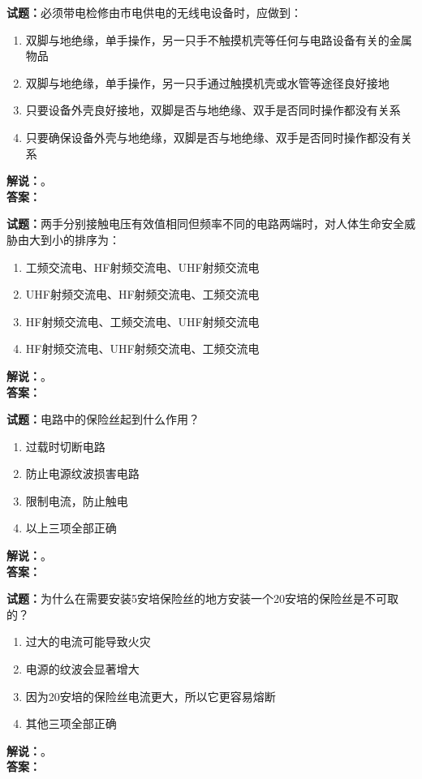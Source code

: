\documentclass{ctexbook}
\begin{document}
\bigskip




\noindent\textbf{试题：}必须带电检修由市电供电的无线电设备时，应做到：
\begin{enumerate}[leftmargin=3em]
\item 双脚与地绝缘，单手操作，另一只手不触摸机壳等任何与电路设备有关的金属物品
\item 双脚与地绝缘，单手操作，另一只手通过触摸机壳或水管等途径良好接地
\item 只要设备外壳良好接地，双脚是否与地绝缘、双手是否同时操作都没有关系
\item 只要确保设备外壳与地绝缘，双脚是否与地绝缘、双手是否同时操作都没有关系
\end{enumerate}
\noindent\textbf{解说：}\textbf{}。\\\noindent\textbf{答案：}

\bigskip




\noindent\textbf{试题：}两手分别接触电压有效值相同但频率不同的电路两端时，对人体生命安全威胁由大到小的排序为：
\begin{enumerate}[leftmargin=3em]
\item 工频交流电、HF射频交流电、UHF射频交流电
\item UHF射频交流电、HF射频交流电、工频交流电
\item HF射频交流电、工频交流电、UHF射频交流电
\item HF射频交流电、UHF射频交流电、工频交流电
\end{enumerate}
\noindent\textbf{解说：}\textbf{}。\\\noindent\textbf{答案：}

\bigskip




\noindent\textbf{试题：}电路中的保险丝起到什么作用？
\begin{enumerate}[leftmargin=3em]
\item 过载时切断电路
\item 防止电源纹波损害电路
\item 限制电流，防止触电
\item 以上三项全部正确
\end{enumerate}
\noindent\textbf{解说：}\textbf{}。\\\noindent\textbf{答案：}

\bigskip




\noindent\textbf{试题：}为什么在需要安装5安培保险丝的地方安装一个20安培的保险丝是不可取的？
\begin{enumerate}[leftmargin=3em]
\item 过大的电流可能导致火灾
\item 电源的纹波会显著增大
\item 因为20安培的保险丝电流更大，所以它更容易熔断
\item 其他三项全部正确
\end{enumerate}
\noindent\textbf{解说：}\textbf{}。\\\noindent\textbf{答案：}
\end{document}
